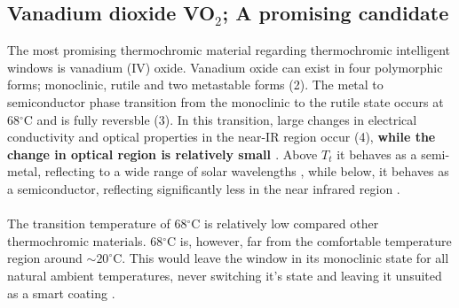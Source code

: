 \subsection{Vanadium dioxide VO$_2$; A promising candidate} \label{sec:vo2}
The most promising thermochromic material regarding thermochromic intelligent windows
is vanadium (IV) oxide.
%
Vanadium oxide can exist in four polymorphic forms; monoclinic, rutile and two 
metastable forms (2). The metal to semiconductor phase transition from the 
monoclinic to the rutile state occurs at 68$^{\circ}$C and is fully reversble (3). 
In this transition, large changes in electrical conductivity and optical properties in the near-IR region 
occur (4), \textbf{while the change in optical region is relatively small \cite[p.~395]{Parkin2006}} . 
Above $T_t$ it behaves as a semi-metal, reflecting to a wide range of solar wavelengths
, while below, it behaves as a semiconductor, reflecting significantly less in the near infrared region 
\cite[p.~4565]{Blackman2009}.%
\\
\\
The transition temperature of 68$^{\circ}$C is relatively low compared other thermochromic materials.
68$^{\circ}$C is, however, far from the comfortable temperature region around $\sim 20^{\circ}$C.
This would leave the window in its monoclinic state for all natural ambient temperatures, 
never switching it's state and leaving it unsuited as a smart coating
\cite[p.~358]{Kamalisarvestani2013} \cite[p.~39]{Kanu2010}.
